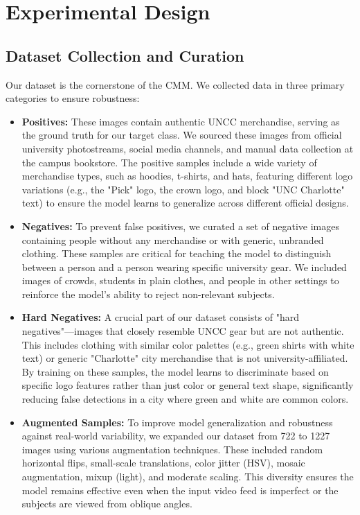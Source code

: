 \section{Experimental Design}
\label{sec:experimental}

\subsection{Dataset Collection and Curation}
Our dataset is the cornerstone of the CMM. We collected data in three primary categories to ensure robustness:
\begin{itemize}
    \item \textbf{Positives:} These images contain authentic UNCC merchandise, serving as the ground truth for our target class. We sourced these images from official university photostreams, social media channels, and manual data collection at the campus bookstore. The positive samples include a wide variety of merchandise types, such as hoodies, t-shirts, and hats, featuring different logo variations (e.g., the "Pick" logo, the crown logo, and block "UNC Charlotte" text) to ensure the model learns to generalize across different official designs.
    \item \textbf{Negatives:} To prevent false positives, we curated a set of negative images containing people without any merchandise or with generic, unbranded clothing. These samples are critical for teaching the model to distinguish between a person and a person wearing specific university gear. We included images of crowds, students in plain clothes, and people in other settings to reinforce the model's ability to reject non-relevant subjects.
    \item \textbf{Hard Negatives:} A crucial part of our dataset consists of "hard negatives"—images that closely resemble UNCC gear but are not authentic. This includes clothing with similar color palettes (e.g., green shirts with white text) or generic "Charlotte" city merchandise that is not university-affiliated. By training on these samples, the model learns to discriminate based on specific logo features rather than just color or general text shape, significantly reducing false detections in a city where green and white are common colors.
    \item \textbf{Augmented Samples:} To improve model generalization and robustness against real-world variability, we expanded our dataset from 722 to 1227 images using various augmentation techniques. These included random horizontal flips, small-scale translations, color jitter (HSV), mosaic augmentation, mixup (light), and moderate scaling. This diversity ensures the model remains effective even when the input video feed is imperfect or the subjects are viewed from oblique angles.
\end{itemize}

